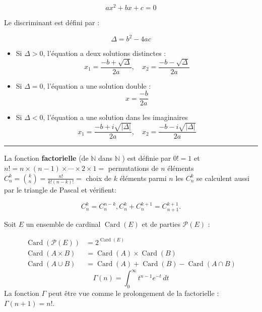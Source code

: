 \begin{f}  
     \[
    ax^2 + bx + c = 0
    \]

    Le discriminant est défini par :
    
    \[
    \Delta = b^2 - 4ac
    \]
       
    \begin{itemize}
        \item Si \(\Delta > 0\), l'équation a deux solutions distinctes :
        \[
        x_1 = \frac{-b + \sqrt{\Delta}}{2a}, \quad x_2 = \frac{-b - \sqrt{\Delta}}{2a}
        \]
        \item Si \(\Delta = 0\), l'équation a une solution double :
        \[
        x = \frac{-b}{2a}
        \]
        \item Si \(\Delta < 0\), l'équation a une solution dans les imaginaires
        \[
        x_1 = \frac{-b + i\sqrt{\lvert\Delta\rvert}}{2a}, \quad x_2 = \frac{-b - i\sqrt{\lvert\Delta\rvert}}{2a}
        \]
    \end{itemize}
\end{f}
\hrule
\begin{f}  

La fonction \textbf{factorielle} (de \(\mathbb{N}\) dans \(\mathbb{N}\) ) est définie par \(0!=1\) et \(n!=n \times(n-1) \times \cdots \times 2 \times 1=\) permutations de \(n\) éléments \(\displaystyle C_n^k=\binom{k}{n}=\frac{n!}{k!(n-k)!}=\) choix de \(k\) éléments parmi \(n\) les \(C_n^k\) se calculent aussi par le triangle de Pascal et vérifient:

\[
C_n^k=C_n^{n-k}, C_n^k+C_n^{k+1}=C_{n+1}^{k+1} .
\]


Soit \(E\) un ensemble de cardinal \(\operatorname{Card}(E)\) et de parties \(\mathcal{P}(E)\) :

\[
\begin{aligned}
\operatorname{Card}(\mathcal{P}(E)) & =2^{\operatorname{Card}(E)} \\
\operatorname{Card}(A \times B) & =\operatorname{Card}(A) \times \operatorname{Card}(B) \\
\operatorname{Card}(A \cup B) & =\operatorname{Card}(A)+\operatorname{Card}(B)-\operatorname{Card}(A \cap B)
\end{aligned}
\]
\[ \Gamma(n) = \int_0^\infty t^{n-1} e^{-t} \, dt \]
La fonction \(\Gamma\) peut être vue comme le prolongement de la factorielle : \(\Gamma(n+1)=n!\).
\end{f}


